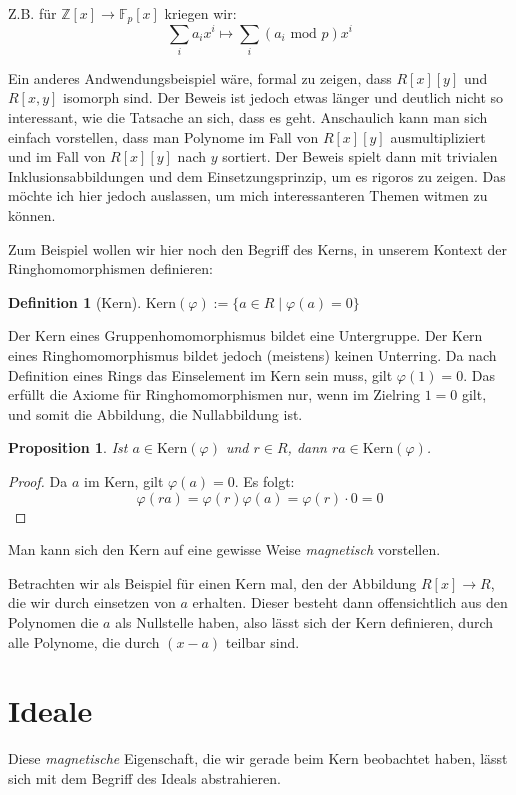\documentclass{article}
\newtheorem*{prop}{Proposition}
\theoremstyle{definition}
\newtheorem*{definition}{Definition}
\theoremstyle{remark}
\begin{document}
Z.B. für $\mathbb Z[x]\to\mathbb F_p[x]$ kriegen wir:
\[\sum_i a_i x^i \longmapsto \sum_i (a_i \text{ mod } p) x^i\]

Ein anderes Andwendungsbeispiel wäre, formal zu zeigen, dass $R[x][y]$ und $R[x,y]$ isomorph sind. Der Beweis
ist jedoch etwas länger und deutlich nicht so interessant, wie die Tatsache an sich, dass es geht. Anschaulich
kann man sich einfach vorstellen, dass man Polynome im Fall von $R[x][y]$ ausmultipliziert und im Fall von
$R[x][y]$ nach $y$ sortiert. Der Beweis spielt dann mit trivialen Inklusionsabbildungen und dem
Einsetzungsprinzip, um es rigoros zu zeigen. Das möchte ich hier jedoch auslassen, um mich interessanteren
Themen witmen zu können.

\vspace{0.7em}
Zum Beispiel wollen wir hier noch den Begriff des Kerns, in unserem Kontext der Ringhomomorphismen definieren:
\begin{definition}[Kern]
    $\text{Kern}(\varphi) := \{a\in R \mid \varphi(a)=0\}$
\end{definition}

Der Kern eines Gruppenhomomorphismus bildet eine Untergruppe. Der Kern eines Ringhomomorphismus bildet jedoch
(meistens) keinen Unterring. Da nach Definition eines Rings das Einselement im Kern sein muss, gilt $\varphi(1)=0$. Das
erfüllt die Axiome für Ringhomomorphismen nur, wenn im Zielring $1=0$ gilt, und somit die Abbildung, die
Nullabbildung ist.

\begin{prop} Ist $a\in \text{Kern}(\varphi)$ und $r\in R$, dann $ra\in \text{Kern}(\varphi)$.\end{prop}
\begin{proof} Da $a$ im Kern, gilt $\varphi(a)=0$. Es folgt:
    \[\varphi(ra)=\varphi(r)\varphi(a)=\varphi(r)\cdot0=0\]
\end{proof}
Man kann sich den Kern auf eine gewisse Weise \emph{magnetisch} vorstellen.

\vspace{0.7em}
Betrachten wir als Beispiel für einen Kern mal, den der Abbildung $R[x]\to R$, die wir durch einsetzen von $a$
erhalten. Dieser besteht dann offensichtlich aus den Polynomen die $a$ als Nullstelle haben, also lässt sich
der Kern definieren, durch alle Polynome, die durch $(x-a)$ teilbar sind.

\newpage
\section{Ideale}
Diese \emph{magnetische} Eigenschaft, die wir gerade beim Kern beobachtet haben, lässt sich mit dem Begriff
des Ideals abstrahieren.
\end{document}
